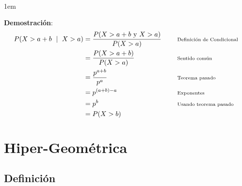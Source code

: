 \documentclass[12pt, fleqn]{report}                             %
\newenvironment{SmallIndentation}[1][0.75em]                    %
        {\begin{adjustwidth}{#1}{}\begin{footnotesize}}             %
        {\end{footnotesize}\end{adjustwidth}}                       %
\DeclareMathOperator \Space {\quad}                             %
\DeclareMathOperator \MiniSpace {\;}                            %
\newcommand \Such {\MiniSpace | \MiniSpace}                     %
\newcommand \Remember[1]{\Space\text{\scriptsize{#1}}}          %
\theoremstyle{break}                                            %
\begin{document}
\begin{itemize}
                        \begin{SmallIndentation}[1em]
                            \textbf{Demostración}:
                            \begin{align*}
                                P(X > a + b \Such X > a)
                                    &= \frac{P(X > a + b \text{ y } X > a)}{P(X > a)}    
                                        && \Remember{Definición de Condicional}     \\
                                    &= \frac{P(X > a + b)}{P(X > a)}    
                                        && \Remember{Sentido común}                 \\
                                    &= \frac{p^{a+b}}{p^a}
                                        && \Remember{Teorema pasado}                \\
                                    &= p^{(a+b)-a}
                                        && \Remember{Exponentes}                    \\
                                    &= p^b
                                        && \Remember{Usando teorema pasado}         \\
                                    &= P(X > b)
                            \end{align*}    
                        
                        
                        \end{SmallIndentation}
                            
                \end{itemize}
 

        \clearpage
        \section{Hiper-Geométrica}

            \subsection{Definición}
\end{document}
